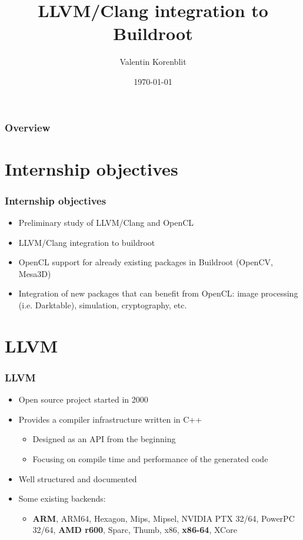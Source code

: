 \documentclass{beamer}
\title[LLVM/Clang + Buildroot]{LLVM/Clang integration to Buildroot}
\author{Valentin Korenblit}
\institute[Smile]
{
Smile \\~\\
\medskip
\textit{valentin.korenblit@smile.fr}
}
\date{\today}
\begin{document}
\begin{frame}
\titlepage
\end{frame}

\begin{frame}
\frametitle{Overview}
\tableofcontents
\end{frame}

\section{Internship objectives}

\begin{frame}
\frametitle{Internship objectives}
\begin{itemize}
  \item Preliminary study of LLVM/Clang and OpenCL
  \item LLVM/Clang integration to buildroot
  \item OpenCL support for already existing packages in Buildroot (OpenCV, Mesa3D)
  \item Integration of new packages that can benefit from OpenCL: image processing (i.e. Darktable), simulation, cryptography, etc.
\end{itemize}
\end{frame}
\section{LLVM}

\begin{frame}
\frametitle{LLVM}
\begin{itemize}
  \item Open source project started in 2000
  \item Provides a compiler infrastructure written in C++
  \begin{itemize}
    \item Designed as an API from the beginning
    \item Focusing on compile time and performance of the generated code
  \end{itemize}
  \item Well structured and documented
  \item Some existing backends:
  \begin{itemize}
    \item \textbf{ARM}, ARM64, Hexagon, Mips, Mipsel, NVIDIA PTX 32/64, PowerPC 32/64, \textbf{AMD r600}, Sparc, Thumb, x86, \textbf{x86-64}, XCore
  \end{itemize}
\end{itemize}
\end{frame}
\end{document}
